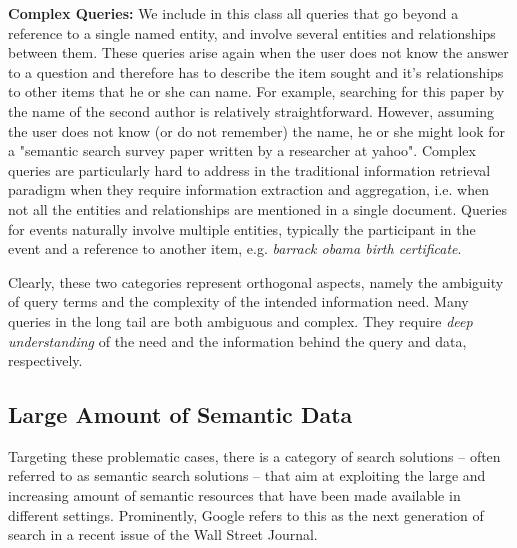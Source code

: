 	\textbf{Complex Queries:} We include in this class all queries that go beyond a reference to a single named entity, and involve several entities and relationships between them. These queries arise again when the user does not know the answer to a question and therefore has to describe the item sought and it's relationships to other items that he or she can name. For example, searching for this paper by the name of the second author is relatively straightforward. However, assuming the user does not know (or do not remember) the name, he or she might look for a "semantic search survey paper written by a researcher at yahoo". Complex queries are particularly hard to address in the traditional information retrieval paradigm when they require information extraction and aggregation, i.e. when not all the entities and relationships are mentioned in a single document. Queries for events naturally involve multiple entities, typically the participant in the event and a reference to another item, e.g. \emph{barrack obama birth certificate}. 

Clearly, these two categories represent orthogonal aspects, namely the ambiguity of query terms and the complexity of the intended information need. Many queries in the long tail are both ambiguous and complex. They require \emph{deep understanding} of the need and the information behind the query and data, respectively. 	

\subsection{Large Amount of Semantic Data}
Targeting these problematic cases, there is a category of search solutions -- often referred to as semantic search solutions -- that aim at exploiting the large and increasing amount of semantic resources that have been made available in different settings. Prominently, Google refers to this as the next generation of search in a recent issue of the Wall Street Journal.

